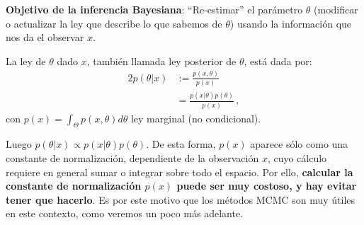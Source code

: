 \textbf{Objetivo de la inferencia Bayesiana}: ``Re-estimar'' el parámetro $\theta$ (modificar o actualizar la ley que describe lo que sabemos de $\theta$) usando la información que nos da el observar $x$.
\begin{theorem}[Bayes]
La ley de $\theta$ dado $x$, también llamada ley posterior de $\theta$, está dada por:
\begin{alignat*}{2}
    p(\theta|x) & := \displaystyle \frac{p(x,\theta)}{p(x)}\\
     & = \displaystyle\frac{p(x|\theta)p(\theta)}{p(x)} \,,
\end{alignat*}
con $p(x)=\displaystyle\int_\Theta p(x,\theta)d\theta$ ley marginal (no condicional).


\end{theorem}
Luego $p(\theta|x)\propto p(x|\theta)p(\theta)$. De esta forma,   $p(x)$ aparece  sólo como una constante de normalización, dependiente de la observaci\'on $x$, cuyo c\'alculo requiere en general sumar o integrar sobre todo el espacio. Por ello,    \textbf{calcular la constante de normalizaci\'on  $p(x)$ puede ser muy costoso,   y hay  evitar tener que hacerlo}.  Es por este motivo que los m\'etodos MCMC son muy \'utiles en este contexto, como veremos un poco m\'as adelante. 
